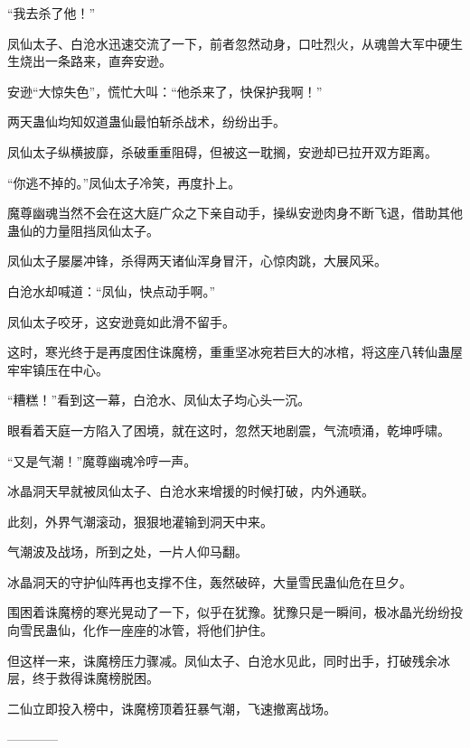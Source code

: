 \begin{this_body}
“我去杀了他！”

凤仙太子、白沧水迅速交流了一下，前者忽然动身，口吐烈火，从魂兽大军中硬生生烧出一条路来，直奔安逊。

安逊“大惊失色”，慌忙大叫：“他杀来了，快保护我啊！”

两天蛊仙均知奴道蛊仙最怕斩杀战术，纷纷出手。

凤仙太子纵横披靡，杀破重重阻碍，但被这一耽搁，安逊却已拉开双方距离。

“你逃不掉的。”凤仙太子冷笑，再度扑上。

魔尊幽魂当然不会在这大庭广众之下亲自动手，操纵安逊肉身不断飞退，借助其他蛊仙的力量阻挡凤仙太子。

凤仙太子屡屡冲锋，杀得两天诸仙浑身冒汗，心惊肉跳，大展风采。

白沧水却喊道：“凤仙，快点动手啊。”

凤仙太子咬牙，这安逊竟如此滑不留手。

这时，寒光终于是再度困住诛魔榜，重重坚冰宛若巨大的冰棺，将这座八转仙蛊屋牢牢镇压在中心。

“糟糕！”看到这一幕，白沧水、凤仙太子均心头一沉。

眼看着天庭一方陷入了困境，就在这时，忽然天地剧震，气流喷涌，乾坤呼啸。

“又是气潮！”魔尊幽魂冷哼一声。

冰晶洞天早就被凤仙太子、白沧水来增援的时候打破，内外通联。

此刻，外界气潮滚动，狠狠地灌输到洞天中来。

气潮波及战场，所到之处，一片人仰马翻。

冰晶洞天的守护仙阵再也支撑不住，轰然破碎，大量雪民蛊仙危在旦夕。

围困着诛魔榜的寒光晃动了一下，似乎在犹豫。犹豫只是一瞬间，极冰晶光纷纷投向雪民蛊仙，化作一座座的冰管，将他们护住。

但这样一来，诛魔榜压力骤减。凤仙太子、白沧水见此，同时出手，打破残余冰层，终于救得诛魔榜脱困。

二仙立即投入榜中，诛魔榜顶着狂暴气潮，飞速撤离战场。

------------

\end{this_body}

